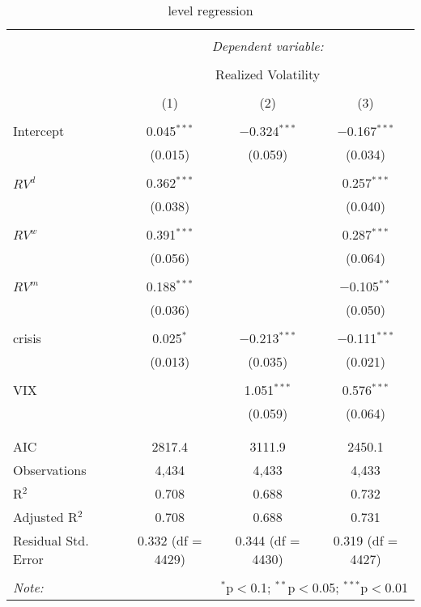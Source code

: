 
\begin{table}[!htbp] \centering 
  \caption{level regression} 
  \label{} 
\begin{tabular}{@{\extracolsep{5pt}}lccc} 
\\[-1.8ex]\hline 
\hline \\[-1.8ex] 
 & \multicolumn{3}{c}{\textit{Dependent variable:}} \\ 
\cline{2-4} 
\\[-1.8ex] & \multicolumn{3}{c}{Realized Volatility} \\ 
\\[-1.8ex] & (1) & (2) & (3)\\ 
\hline \\[-1.8ex] 
 Intercept & 0.045$^{***}$ & $-$0.324$^{***}$ & $-$0.167$^{***}$ \\ 
  & (0.015) & (0.059) & (0.034) \\ 
  & & & \\ 
 $RV^{d}$ & 0.362$^{***}$ &  & 0.257$^{***}$ \\ 
  & (0.038) &  & (0.040) \\ 
  & & & \\ 
 $RV^{w}$ & 0.391$^{***}$ &  & 0.287$^{***}$ \\ 
  & (0.056) &  & (0.064) \\ 
  & & & \\ 
 $RV^{m}$ & 0.188$^{***}$ &  & $-$0.105$^{**}$ \\ 
  & (0.036) &  & (0.050) \\ 
  & & & \\ 
 crisis & 0.025$^{*}$ & $-$0.213$^{***}$ & $-$0.111$^{***}$ \\ 
  & (0.013) & (0.035) & (0.021) \\ 
  & & & \\ 
 VIX &  & 1.051$^{***}$ & 0.576$^{***}$ \\ 
  &  & (0.059) & (0.064) \\ 
  & & & \\ 
\hline \\[-1.8ex] 
AIC & 2817.4 & 3111.9 & 2450.1 \\ 
Observations & 4,434 & 4,433 & 4,433 \\ 
R$^{2}$ & 0.708 & 0.688 & 0.732 \\ 
Adjusted R$^{2}$ & 0.708 & 0.688 & 0.731 \\ 
Residual Std. Error & 0.332 (df = 4429) & 0.344 (df = 4430) & 0.319 (df = 4427) \\ 
\hline 
\hline \\[-1.8ex] 
\textit{Note:}  & \multicolumn{3}{r}{$^{*}$p$<$0.1; $^{**}$p$<$0.05; $^{***}$p$<$0.01} \\ 
\end{tabular} 
\end{table} 
